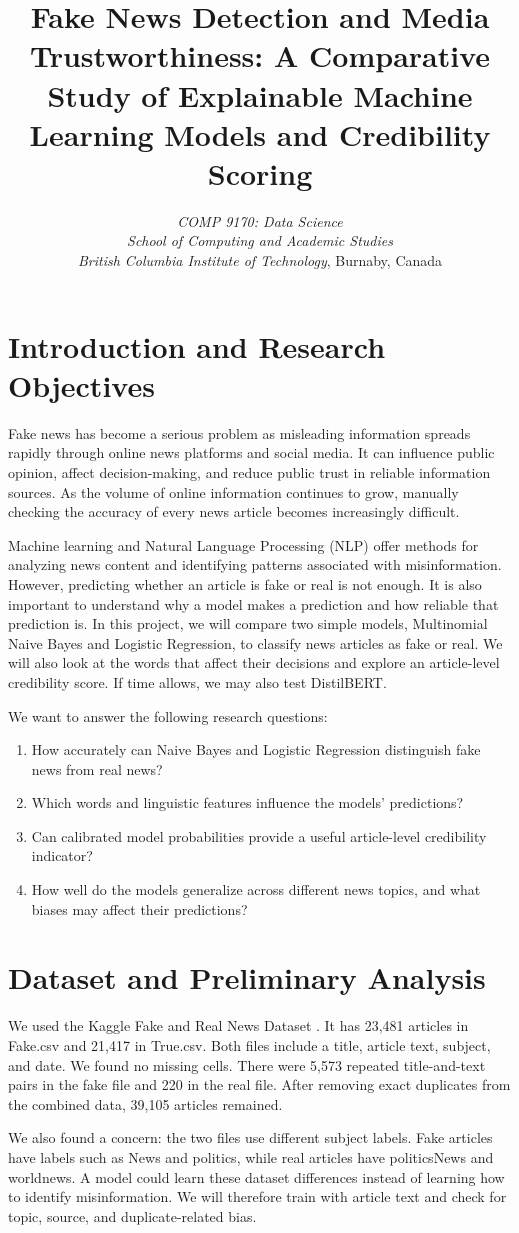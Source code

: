 \documentclass[conference]{IEEEtran}
\title{Fake News Detection and Media Trustworthiness: A Comparative Study of Explainable Machine Learning Models and Credibility Scoring}
\author{\IEEEauthorblockN{Miskat Jahan and Radhika}
\textit{COMP 9170: Data Science}\\
\textit{School of Computing and Academic Studies}\\
\textit{British Columbia Institute of Technology}, Burnaby, Canada\\}
\begin{document}
\maketitle




\section{Introduction and Research Objectives}
Fake news has become a serious problem as misleading information spreads rapidly through online news platforms and social media. It can influence public opinion, affect decision-making, and reduce public trust in reliable information sources. As the volume of online information continues to grow, manually checking the accuracy of every news article becomes increasingly difficult.\par
Machine learning and Natural Language Processing (NLP) offer methods for analyzing news content and identifying patterns associated with misinformation. However, predicting whether an article is fake or real is not enough. It is also important to understand why a model makes a prediction and how reliable that prediction is. In this project, we will compare two simple models, Multinomial Naive Bayes and Logistic Regression, to classify news articles as fake or real. We will also look at the words that affect their decisions and explore an article-level credibility score. If time allows, we may also test DistilBERT.\par
We want to answer the following research questions:\par
\begin{enumerate}
\item How accurately can Naive Bayes and Logistic Regression distinguish fake news from real news?
\item Which words and linguistic features influence the models' predictions?
\item Can calibrated model probabilities provide a useful article-level credibility indicator?
\item How well do the models generalize across different news topics, and what biases may affect their predictions?
\end{enumerate}
\section{Dataset and Preliminary Analysis}
We used the Kaggle Fake and Real News Dataset \cite{bisaillon}. It has 23,481 articles in Fake.csv and 21,417 in True.csv. Both files include a title, article text, subject, and date. We found no missing cells. There were 5,573 repeated title-and-text pairs in the fake file and 220 in the real file. After removing exact duplicates from the combined data, 39,105 articles remained.\par
We also found a concern: the two files use different subject labels. Fake articles have labels such as News and politics, while real articles have politicsNews and worldnews. A model could learn these dataset differences instead of learning how to identify misinformation. We will therefore train with article text and check for topic, source, and duplicate-related bias.\par
\end{document}
